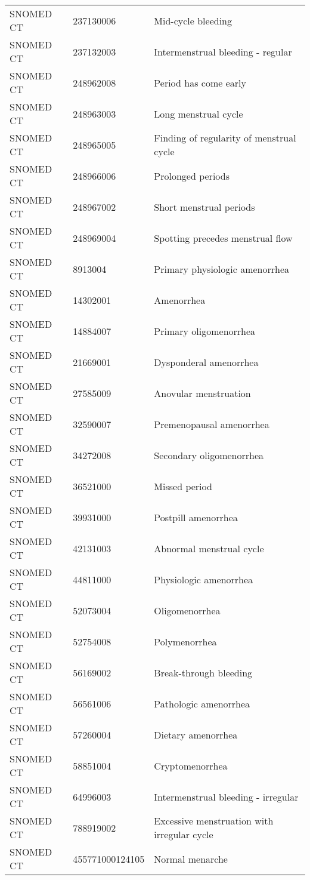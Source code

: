 \begin{longtable}{p{}p{}p{}}
  SNOMED CT & 237130006 & Mid-cycle bleeding \\ 
  SNOMED CT & 237132003 & Intermenstrual bleeding - regular \\ 
  SNOMED CT & 248962008 & Period has come early \\ 
  SNOMED CT & 248963003 & Long menstrual cycle \\ 
  SNOMED CT & 248965005 & Finding of regularity of menstrual cycle \\ 
  SNOMED CT & 248966006 & Prolonged periods \\ 
  SNOMED CT & 248967002 & Short menstrual periods \\ 
  SNOMED CT & 248969004 & Spotting precedes menstrual flow \\ 
  SNOMED CT & 8913004 & Primary physiologic amenorrhea \\ 
  SNOMED CT & 14302001 & Amenorrhea \\ 
  SNOMED CT & 14884007 & Primary oligomenorrhea \\ 
  SNOMED CT & 21669001 & Dysponderal amenorrhea \\ 
  SNOMED CT & 27585009 & Anovular menstruation \\ 
  SNOMED CT & 32590007 & Premenopausal amenorrhea \\ 
  SNOMED CT & 34272008 & Secondary oligomenorrhea \\ 
  SNOMED CT & 36521000 & Missed period \\ 
  SNOMED CT & 39931000 & Postpill amenorrhea \\ 
  SNOMED CT & 42131003 & Abnormal menstrual cycle \\ 
  SNOMED CT & 44811000 & Physiologic amenorrhea \\ 
  SNOMED CT & 52073004 & Oligomenorrhea \\ 
  SNOMED CT & 52754008 & Polymenorrhea \\ 
  SNOMED CT & 56169002 & Break-through bleeding \\ 
  SNOMED CT & 56561006 & Pathologic amenorrhea \\ 
  SNOMED CT & 57260004 & Dietary amenorrhea \\ 
  SNOMED CT & 58851004 & Cryptomenorrhea \\ 
  SNOMED CT & 64996003 & Intermenstrual bleeding - irregular \\ 
  SNOMED CT & 788919002 & Excessive menstruation with irregular cycle \\ 
  SNOMED CT & 455771000124105 & Normal menarche \\ 

\end{longtable}
